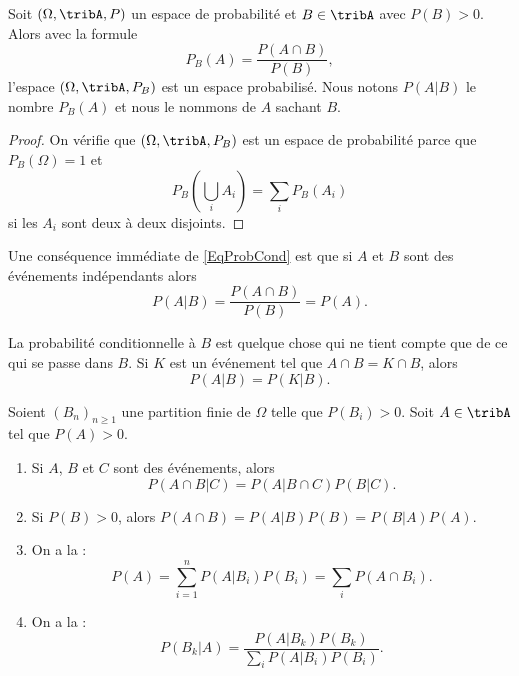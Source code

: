 \begin{propositionDef}      \label{DEFooGJVHooVbhVYv}
    Soit \( (\Omega,\tribA,P)\) un espace de probabilité et \( B\in\tribA\) avec $P(B)>0$. Alors avec la formule
    \begin{equation}    \label{EqProbCond}
        P_B(A)=\frac{ P(A\cap B) }{ P(B) },
    \end{equation}
    l'espace \( (\Omega,\tribA,P_B)\) est un espace probabilisé. Nous notons \( P(A|B)\) le nombre \( P_B(A) \) et nous le nommons  de \( A\) sachant \( B\).
\end{propositionDef}

\begin{proof}
    On vérifie que \( (\Omega,\tribA,P_B)\) est un espace de probabilité parce que \( P_B(\Omega)=1\) et
    \begin{equation}
        P_B(\bigcup_iA_i)=\sum_iP_B(A_i)
    \end{equation}
    si les \( A_i\) sont deux à deux disjoints.
\end{proof}

Une conséquence immédiate de \eqref{EqProbCond} est que si \( A\) et \( B\) sont des événements indépendants alors
\begin{equation}
    P(A|B)=\frac{ P(A\cap B) }{ P(B) }=P(A).
\end{equation}

La probabilité conditionnelle à \( B\) est quelque chose qui ne tient compte que de ce qui se passe dans \( B\). Si \( K\) est un événement tel que \( A\cap B=K\cap B\), alors
\begin{equation}    \label{EqOVHCWom}
    P(A|B)=P(K|B).
\end{equation}

\begin{theorem}     \label{ThoBayesEtAutres}
    Soient \( (B_n)_{n\geq 1}\) une partition finie de \( \Omega\) telle que \( P(B_i)>0\). Soit \( A\in\tribA\) tel que \( P(A)>0\).
    \begin{enumerate}
        \item
            Si \( A\), \( B\) et \( C\) sont des événements, alors
            \begin{equation}
                P(A\cap B|C)=P(A|B\cap C)P(B|C).
            \end{equation}
        \item
            Si \( P(B)>0\), alors \( P(A\cap B)=P(A|B)P(B)=P(B|A)P(A)\).
        \item On a la  :
            \begin{equation}
                P(A)=\sum_{i=1}^nP(A|B_i)P(B_i)=\sum_iP(A\cap B_i).
            \end{equation}
        \item
            On a la  :
            \begin{equation}
                P(B_k|A)=\frac{ P(A|B_k)P(B_k) }{ \sum_iP(A|B_i)P(B_i) }.
            \end{equation}
    \end{enumerate}
\end{theorem}

